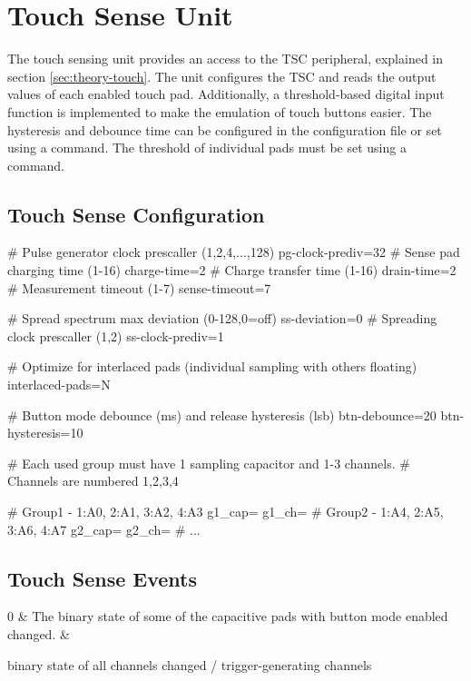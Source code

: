 \section{Touch Sense Unit}

The touch sensing unit provides an access to the \gls{TSC} peripheral, explained in section \ref{sec:theory-touch}. The unit configures the \gls{TSC} and reads the output values of each enabled touch pad. Additionally, a threshold-based digital input function is implemented to make the emulation of touch buttons easier. The hysteresis and debounce time can be configured in the configuration file or set using a command. The threshold of individual pads must be set using a command.

\subsection{Touch Sense Configuration}

\begin{inicode}
# Pulse generator clock prescaller (1,2,4,...,128)
pg-clock-prediv=32
# Sense pad charging time (1-16)
charge-time=2
# Charge transfer time (1-16)
drain-time=2
# Measurement timeout (1-7)
sense-timeout=7

# Spread spectrum max deviation (0-128,0=off)
ss-deviation=0
# Spreading clock prescaller (1,2)
ss-clock-prediv=1

# Optimize for interlaced pads (individual sampling with others floating)
interlaced-pads=N

# Button mode debounce (ms) and release hysteresis (lsb)
btn-debounce=20
btn-hysteresis=10

# Each used group must have 1 sampling capacitor and 1-3 channels.
# Channels are numbered 1,2,3,4

# Group1 - 1:A0, 2:A1, 3:A2, 4:A3
g1_cap=
g1_ch=
# Group2 - 1:A4, 2:A5, 3:A6, 4:A7
g2_cap=
g2_ch=
# ...
\end{inicode}


\subsection{Touch Sense Events}

\begin{cmdlist}
    0 & 
    The binary state of some of the capacitive pads with button mode enabled changed.
    & \begin{cmdpld}
         binary state of all channels
         changed / trigger-generating channels
    \end{cmdpld} \\
\end{cmdlist}

